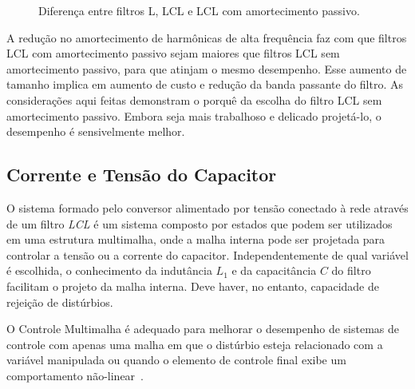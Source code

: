     \begin{figure}[htb]
        \caption{Diferença entre filtros L, LCL e LCL com amortecimento passivo.}
        \label{fig:R_in_LCL}
    \end{figure}

    A redução no amortecimento de harmônicas de alta frequência faz com que filtros
    LCL com amortecimento passivo sejam maiores que filtros LCL sem amortecimento
    passivo, para que atinjam o mesmo desempenho. Esse aumento de tamanho implica
    em aumento de custo e redução da banda passante do filtro. As considerações
    aqui feitas demonstram o porquê da escolha do filtro LCL sem
    amortecimento passivo. Embora seja mais trabalhoso e delicado projetá-lo,
    o desempenho é sensivelmente melhor.


\subsection{Corrente e Tensão do Capacitor}

    O sistema formado pelo conversor alimentado por tensão conectado à rede através
    de um filtro \emph{LCL} é um sistema composto por estados que podem ser
    utilizados em uma estrutura multimalha, onde a malha interna pode ser projetada
    para controlar a tensão ou a corrente do capacitor. Independentemente de qual
    variável é escolhida, o conhecimento da indutância $L_1$ e da capacitância $C$
    do filtro facilitam o projeto da malha interna. Deve haver, no entanto, capacidade
    de rejeição de distúrbios.


    O Controle Multimalha é adequado para melhorar o desempenho
    de sistemas de controle com apenas uma malha em que o distúrbio esteja
    relacionado com a variável manipulada ou quando o elemento de controle final
    exibe um comportamento não-linear~\cite{ref:LEE}.

